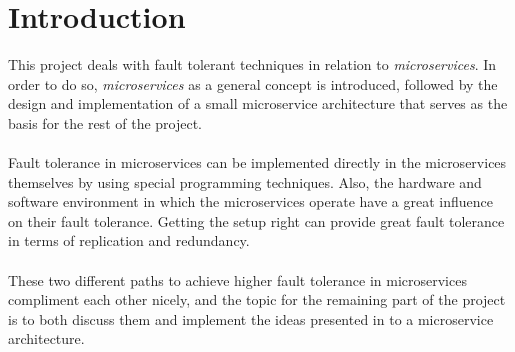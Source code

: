 \section{Introduction}
This project deals with fault tolerant techniques in relation to
\textit{microservices}. In order to do so, \textit{microservices} as a
general concept is introduced, followed by the design and
implementation of a small microservice architecture that serves as the
basis for the rest of the project.
\\\\
Fault tolerance in microservices can be implemented directly in the
microservices themselves by using special programming
techniques. Also, the hardware and software environment in which the
microservices operate have a great influence on their fault
tolerance. Getting the setup right can provide great fault tolerance
in terms of replication and redundancy.
\\\\
These two different paths to achieve higher fault tolerance in
microservices compliment each other nicely, and the topic for the
remaining part of the project is to both discuss them and implement
the ideas presented in to a microservice architecture.
